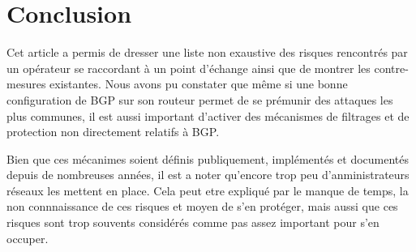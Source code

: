 




\section{Conclusion}

Cet article a permis de dresser une liste non exaustive des risques rencontrés par un opérateur se raccordant à un point d'échange ainsi que de montrer les contre-mesures existantes.
Nous avons pu constater que même si une bonne configuration de BGP sur son routeur permet de se prémunir des attaques les plus communes, il est aussi important d'activer des mécanismes de filtrages et de protection non directement relatifs à BGP.

Bien que ces mécanimes soient définis publiquement, implémentés et documentés depuis de nombreuses années, il est a noter qu'encore trop peu d'anministrateurs réseaux les mettent en place. Cela peut etre expliqué par le manque de temps, la non connnaissance de ces risques et moyen de s'en protéger, mais aussi que ces risques sont trop souvents considérés comme pas assez important pour s'en occuper.



